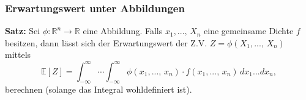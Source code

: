 \documentclass[a4paper]{extarticle}
\begin{document}
\subsubsection{Erwartungswert unter Abbildungen}

\begin{cbox}
    \textbf{Satz:} Sei $\phi : \mathbb{R}^n \to \mathbb{R}$ eine Abbildung. Falls $x_1,..., \, X_n$ eine gemeinsame Dichte $f$ besitzen, dann lässt sich der Erwartungswert der Z.V. $Z = \phi(X_1,..., \, X_n)$ mittels
    \[
        \mathbb{E}[Z] = \int_{- \infty}^{\infty} \cdots \int_{- \infty}^{\infty} \phi(x_1,..., \, x_n) \cdot f(x_1,..., \, x_n) \, dx_1...dx_n,
    \]
    berechnen (solange das Integral wohldefiniert ist).
\end{cbox}
\end{document}
